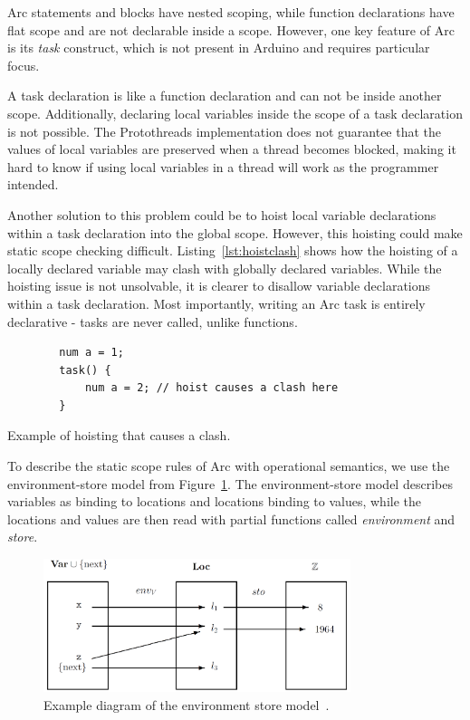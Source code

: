 Arc statements and blocks have nested scoping, while function declarations have flat scope and are not declarable inside a scope. However, one key feature of Arc is its \textit{task} construct, which is not present in Arduino and requires particular focus.

A task declaration is like a function declaration and can not be inside another scope. Additionally, declaring local variables inside the scope of a task declaration is not possible. The Protothreads implementation does not guarantee that the values of local variables are preserved when a thread becomes blocked, making it hard to know if using local variables in a thread will work as the programmer intended.

Another solution to this problem could be to hoist local variable declarations within a task declaration into the global scope. However, this hoisting could make static scope checking difficult. Listing~\ref{lst:hoistclash} shows how the hoisting of a locally declared variable may clash with globally declared variables. While the hoisting issue is not unsolvable, it is clearer to disallow variable declarations within a task declaration. Most importantly, writing an Arc task is entirely declarative - tasks are never called, unlike functions.


\begin{listing}[htb!]
    \begin{verbatim}
        num a = 1;
        task() {
            num a = 2; // hoist causes a clash here
        }
    \end{verbatim}
    \caption{Example of hoisting that causes a clash.}
    \label{lst:hoistclash}
\end{listing}


To describe the static scope rules of Arc with operational semantics, we use the environment-store model from Figure~\ref{fig:envstomodel}. The environment-store model describes variables as binding to locations and locations binding to values, while the locations and values are then read with partial functions called \textit{environment} and \textit{store}.


\begin{figure}[htb!]
    \centering
    \includegraphics[width=0.8\textwidth]{figures/Environment_Store.png}
    \caption{Example diagram of the environment store model~\cite{Huttel2010}.}
    \label{fig:envstomodel}
\end{figure}


